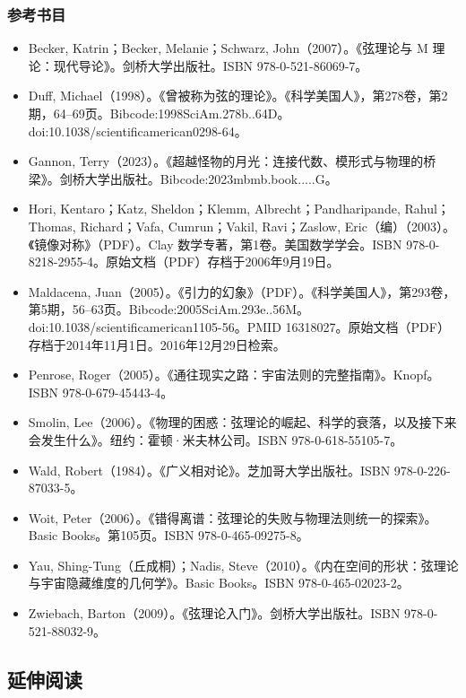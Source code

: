 \subsubsection{参考书目}  
\begin{itemize}
\item Becker, Katrin；Becker, Melanie；Schwarz, John（2007）。《弦理论与 M 理论：现代导论》。剑桥大学出版社。ISBN 978-0-521-86069-7。  
\item Duff, Michael（1998）。《曾被称为弦的理论》。《科学美国人》，第278卷，第2期，64–69页。Bibcode:1998SciAm.278b..64D。doi:10.1038/scientificamerican0298-64。  
\item Gannon, Terry（2023）。《超越怪物的月光：连接代数、模形式与物理的桥梁》。剑桥大学出版社。Bibcode:2023mbmb.book.....G。  
\item Hori, Kentaro；Katz, Sheldon；Klemm, Albrecht；Pandharipande, Rahul；Thomas, Richard；Vafa, Cumrun；Vakil, Ravi；Zaslow, Eric（编）（2003）。《镜像对称》（PDF）。Clay 数学专著，第1卷。美国数学学会。ISBN 978-0-8218-2955-4。原始文档（PDF）存档于2006年9月19日。  
\item Maldacena, Juan（2005）。《引力的幻象》（PDF）。《科学美国人》，第293卷，第5期，56–63页。Bibcode:2005SciAm.293e..56M。doi:10.1038/scientificamerican1105-56。PMID 16318027。原始文档（PDF）存档于2014年11月1日。2016年12月29日检索。  
\item Penrose, Roger（2005）。《通往现实之路：宇宙法则的完整指南》。Knopf。ISBN 978-0-679-45443-4。  
\item Smolin, Lee（2006）。《物理的困惑：弦理论的崛起、科学的衰落，以及接下来会发生什么》。纽约：霍顿·米夫林公司。ISBN 978-0-618-55105-7。  
\item Wald, Robert（1984）。《广义相对论》。芝加哥大学出版社。ISBN 978-0-226-87033-5。  
\item Woit, Peter（2006）。《错得离谱：弦理论的失败与物理法则统一的探索》。Basic Books。第105页。ISBN 978-0-465-09275-8。  
\item Yau, Shing-Tung（丘成桐）；Nadis, Steve（2010）。《内在空间的形状：弦理论与宇宙隐藏维度的几何学》。Basic Books。ISBN 978-0-465-02023-2。  
\item Zwiebach, Barton（2009）。《弦理论入门》。剑桥大学出版社。ISBN 978-0-521-88032-9。
\end{itemize}
\subsection{延伸阅读}  
